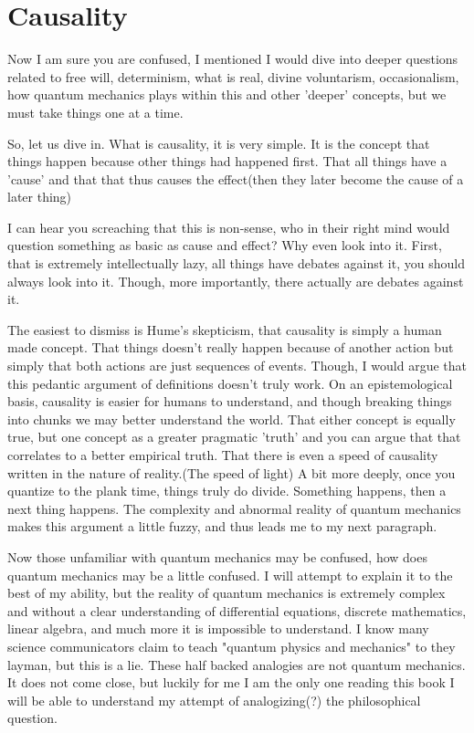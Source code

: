 \section{Causality}
\par Now I am sure you are confused, I mentioned I would dive into deeper questions related to free will, determinism, what is real, divine voluntarism, occasionalism, how quantum mechanics plays within this and other 'deeper' concepts, but we must take things one at a time.
\par So, let us dive in. What is causality, it is very simple. It is the concept that things happen because other things had happened first. That all things  have a 'cause' and that that thus causes the effect(then they later become the cause of a later thing)
\par I can hear you screaching that this is non-sense, who in their right mind would question something as basic as cause and effect? Why even look into it. First, that is extremely intellectually lazy, all things have debates against it, you should always look into it. Though, more importantly, there actually are debates against it.
\par The easiest to dismiss is Hume's skepticism, that causality is simply a human made concept. That things doesn't really happen because of another action but simply that both actions are just sequences of events. Though, I would argue that this pedantic argument of definitions doesn't truly work. On an epistemological basis, causality is easier for humans to understand, and though breaking things into chunks we may better understand the world. That either concept is equally true, but one concept as a greater pragmatic 'truth' and you can argue that that correlates to a better empirical truth. That there is even a speed of causality written in the nature of reality.(The speed of light) A bit more deeply, once you quantize to the plank time, things truly do divide. Something happens, then a next thing happens. The complexity and abnormal reality of quantum mechanics makes this argument a little fuzzy, and thus leads me to my next paragraph.
\par Now those unfamiliar with quantum mechanics may be confused, how does quantum mechanics may be a little confused. I will attempt to explain it to the best of my ability, but the reality of quantum mechanics is extremely complex and without a clear understanding of differential equations, discrete mathematics, linear algebra, and much more it is impossible to understand. I know many science communicators claim to teach "quantum physics and mechanics" to they layman, but this is a lie. These half backed analogies are not quantum mechanics. It does not come close, but luckily for me I am the only one reading this book I will be able to understand my attempt of analogizing(?) the philosophical question.
